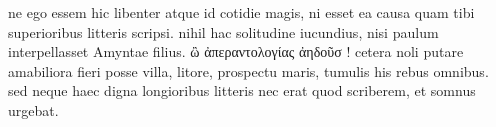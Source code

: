 


 ne ego essem hic libenter atque id cotidie magis, ni esset ea causa quam tibi superioribus litteris scripsi. nihil hac solitudine iucundius, nisi paulum interpellasset Amyntae filius. ὢ ἀπεραντολογίας ἀηδοῦσ ! cetera noli putare amabiliora fieri posse villa, litore, prospectu maris, tumulis his rebus omnibus. sed neque haec digna longioribus litteris nec erat quod scriberem, et somnus urgebat.

